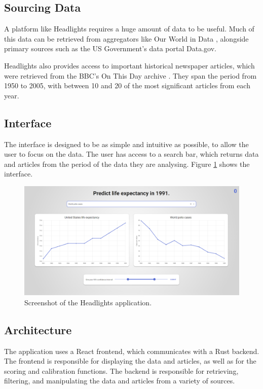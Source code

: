 \documentclass{article}
\begin{document}
\subsection{Sourcing Data}

A platform like Headlights requires a huge amount of data to be useful. Much of this data can be retrieved from aggregators like Our World in Data \cite{ourworldindata}, alongside primary sources such as the US Government's data portal Data.gov.

Headlights also provides access to important historical newspaper articles, which were retrieved from the BBC's On This Day archive \cite{onthisday}. They span the period from 1950 to 2005, with between 10 and 20 of the most significant articles from each year.

\subsection{Interface}

The interface is designed to be as simple and intuitive as possible, to allow the user to focus on the data. The user has access to a search bar, which returns data and articles from the period of the data they are analysing. Figure \ref{fig:screenshot} shows the interface.

\begin{figure}[h]
  \centering
  \includegraphics[width=\textwidth]{screenshot.png}
  \caption{Screenshot of the Headlights application.}
  \label{fig:screenshot}
\end{figure}

\newpage

\subsection{Architecture}

The application uses a React frontend, which communicates with a Rust backend. The frontend is responsible for displaying the data and articles, as well as for the scoring and calibration functions. The backend is responsible for retrieving, filtering, and manipulating the data and articles from a variety of sources.
\end{document}
